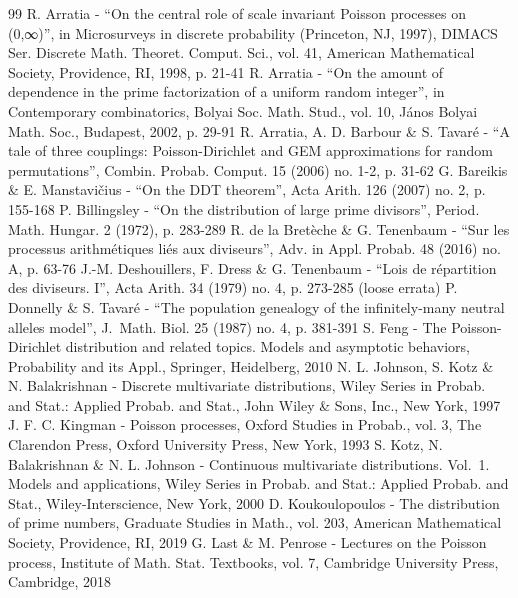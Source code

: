 \documentclass[10pt,a4paper]{article}
\theoremstyle{plain}
\theoremstyle{definition}
\begin{document}
\begin{thebibliography}{99}
 R. Arratia - “On the central role of scale invariant Poisson processes on (0,∞)”, in Microsurveys in discrete probability (Princeton, NJ, 1997), DIMACS Ser. Discrete Math. Theoret. Comput. Sci., vol. 41, American Mathematical Society, Providence, RI, 1998, p. 21-41
 R. Arratia - “On the amount of dependence in the prime factorization of a uniform random integer”, in Contemporary combinatorics, Bolyai Soc. Math. Stud., vol. 10, János Bolyai Math. Soc., Budapest, 2002, p. 29-91
 R. Arratia, A. D. Barbour \& S. Tavaré - “A tale of three couplings: Poisson-Dirichlet and GEM approximations for random permutations”, Combin. Probab. Comput. 15 (2006) no. 1-2, p. 31-62
 G. Bareikis \& E. Manstavičius - “On the DDT theorem”, Acta Arith. 126 (2007) no. 2, p. 155-168
 P. Billingsley - “On the distribution of large prime divisors”, Period. Math. Hungar. 2 (1972), p. 283-289
 R. de la Bretèche \& G. Tenenbaum - “Sur les processus arithmétiques liés aux diviseurs”, Adv. in Appl. Probab. 48 (2016) no. A, p. 63-76
 J.-M. Deshouillers, F. Dress \& G. Tenenbaum - “Lois de répartition des diviseurs. I”, Acta Arith. 34 (1979) no. 4, p. 273-285 (loose errata)
 P. Donnelly \& S. Tavaré - “The population genealogy of the infinitely-many neutral alleles model”, J. Math. Biol. 25 (1987) no. 4, p. 381-391
 S. Feng - The Poisson-Dirichlet distribution and related topics. Models and asymptotic behaviors, Probability and its Appl., Springer, Heidelberg, 2010
 N. L. Johnson, S. Kotz \& N. Balakrishnan - Discrete multivariate distributions, Wiley Series in Probab. and Stat.: Applied Probab. and Stat., John Wiley \& Sons, Inc., New York, 1997
 J. F. C. Kingman - Poisson processes, Oxford Studies in Probab., vol. 3, The Clarendon Press, Oxford University Press, New York, 1993
 S. Kotz, N. Balakrishnan \& N. L. Johnson - Continuous multivariate distributions. Vol. 1. Models and applications, Wiley Series in Probab. and Stat.: Applied Probab. and Stat., Wiley-Interscience, New York, 2000
 D. Koukoulopoulos - The distribution of prime numbers, Graduate Studies in Math., vol. 203, American Mathematical Society, Providence, RI, 2019
 G. Last \& M. Penrose - Lectures on the Poisson process, Institute of Math. Stat. Textbooks, vol. 7, Cambridge University Press, Cambridge, 2018

\end{thebibliography}
\end{document}
